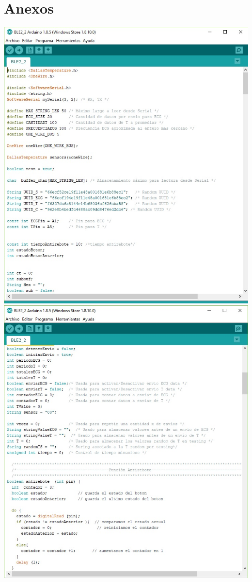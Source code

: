 \chapter{Anexos}\label{Anexos}


\includegraphics[width=1\textwidth]{figura/anexos/code1.jpg}
\includegraphics[width=1\textwidth]{figura/anexos/code2.jpg}
